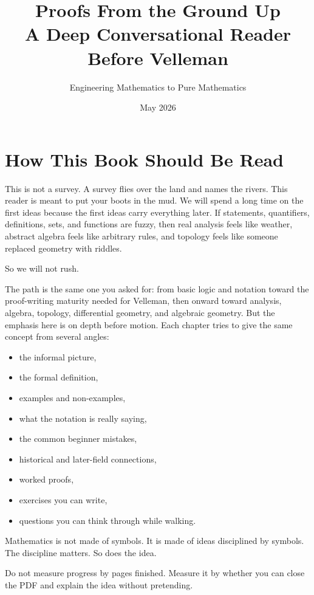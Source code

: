 \documentclass[12pt]{article}
\title{\textbf{Proofs From the Ground Up}\\A Deep Conversational Reader Before Velleman}
\author{Engineering Mathematics to Pure Mathematics}
\date{May 2026}
\begin{document}
\maketitle
\tableofcontents
\newpage

\section*{How This Book Should Be Read}

This is not a survey. A survey flies over the land and names the rivers. This reader is meant to put your boots in the mud. We will spend a long time on the first ideas because the first ideas carry everything later. If statements, quantifiers, definitions, sets, and functions are fuzzy, then real analysis feels like weather, abstract algebra feels like arbitrary rules, and topology feels like someone replaced geometry with riddles.

So we will not rush.

The path is the same one you asked for: from basic logic and notation toward the proof-writing maturity needed for Velleman, then onward toward analysis, algebra, topology, differential geometry, and algebraic geometry. But the emphasis here is on depth before motion. Each chapter tries to give the same concept from several angles:

\begin{itemize}
\item the informal picture,
\item the formal definition,
\item examples and non-examples,
\item what the notation is really saying,
\item the common beginner mistakes,
\item historical and later-field connections,
\item worked proofs,
\item exercises you can write,
\item questions you can think through while walking.
\end{itemize}

Mathematics is not made of symbols. It is made of ideas disciplined by symbols. The discipline matters. So does the idea.

\begin{focusbox}
Do not measure progress by pages finished. Measure it by whether you can close the PDF and explain the idea without pretending.
\end{focusbox}
\end{document}
